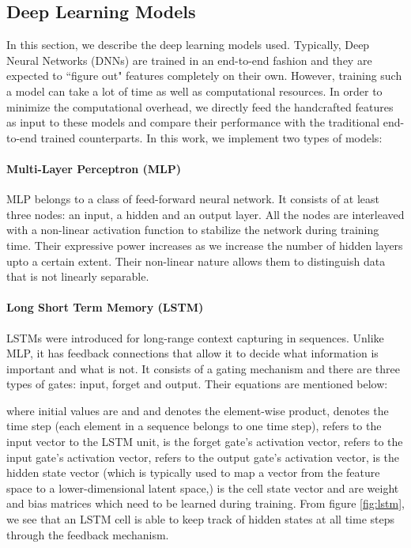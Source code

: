 \documentclass[conference]{IEEEtran}
\begin{document}
\subsection{Deep Learning Models}
In this section, we describe the deep learning models used. Typically, Deep Neural Networks (DNNs) are trained in an end-to-end fashion and they are expected to ``figure out" features completely on their own. However, training such a model can take a lot of time as well as computational resources. In order to minimize the computational overhead, we directly feed the handcrafted features as input to these models and compare their performance with the traditional end-to-end trained counterparts. In this work, we implement two types of models:
\paragraph{Multi-Layer Perceptron (MLP)} MLP belongs to a class of feed-forward neural network. It consists of at least three nodes: an input, a hidden and an output layer. All the nodes are interleaved with a non-linear activation function to stabilize the network during training time. Their expressive power increases as we increase the number of hidden layers upto a certain extent. Their non-linear nature allows them to distinguish data that is not linearly separable.
\paragraph{Long Short Term Memory (LSTM)} LSTMs \cite{hochreiter1997long} were introduced for long-range context capturing in sequences. Unlike MLP, it has feedback connections that allow it to decide what information is important and what is not. It consists of a gating mechanism and there are three types of gates: input, forget and output. Their equations are mentioned below:











where initial values are  and  and  denotes the element-wise product,  denotes the time step (each element in a sequence belongs to one time step),  refers to the input vector to the LSTM unit,  is the forget gate's activation vector,  refers to the input gate's activation vector,  refers to the output gate's activation vector,  is the hidden state vector (which is typically used to map a vector from the feature space to a lower-dimensional latent space,)  is the cell state vector and  are weight and bias matrices which need to be learned during training. From figure \ref{fig:lstm}, we see that an LSTM cell is able to keep track of hidden states at all time steps through the feedback mechanism.
\end{document}
